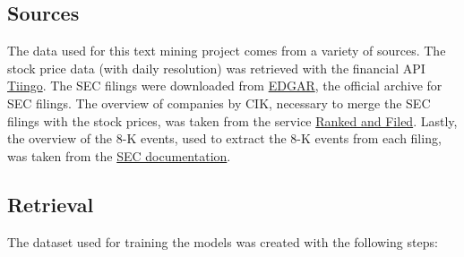 \documentclass{article}
\begin{document}
	\subsection{Sources}
	
	The data used for this text mining project comes from a variety of sources. The stock price data (with daily resolution) was retrieved with the financial API \href{https://www.tiingo.com}{Tiingo}. The SEC filings were downloaded from \href{https://www.sec.gov/Archives/edgar/full-index/}{EDGAR}, the official archive for SEC filings. The overview of companies by CIK, necessary to merge the SEC filings with the stock prices, was taken from the service \href{http://rankandfiled.com/#/data/tickers}{Ranked and Filed}. Lastly, the overview of the 8-K events, used to extract the 8-K events from each filing, was taken from the  \href{https://www.sec.gov/fast-answers/answersform8khtm.html}{SEC documentation}. 
	
	\subsection{Retrieval}
	
	The dataset used for training the models was created with the following steps: 
	
\end{document}
